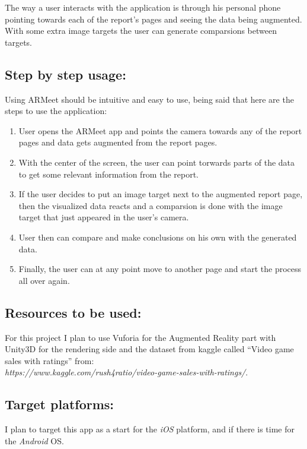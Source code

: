 \documentclass{article}
\begin{document}
The way a user interacts with the application is through his personal
phone pointing towards each of the report's pages and seeing the data being
augmented. With some extra image targets the user can generate comparsions
between targets.

\subsection{Step by step usage:}
Using ARMeet should be intuitive and easy to use, being said that here are
the steps to use the application:
\begin{enumerate}
\item User opens the ARMeet app and points the camera towards any of the
  report pages and data gets augmented from the report pages.
\item With the center of the screen, the user can point torwards parts of the data to
  get some relevant information from the report.
\item If the user decides to put an image target next to the augmented report
  page, then the visualized data reacts and a comparsion is done with the
  image target that just appeared in the user's camera.
\item User then can compare and make conclusions on his own with the
  generated data.
\item Finally, the user can at any point move to another page and start the
  process all over again.
\end{enumerate}

\subsection{Resources to be used:}
For this project I plan to use Vuforia for the Augmented Reality part with
Unity3D for the rendering side and the dataset from kaggle called ``Video
game sales with ratings'' from: \\\textit{https://www.kaggle.com/rush4ratio/video-game-sales-with-ratings/}.
\subsection{Target platforms:}
I plan to target this app as a start for the \textit{iOS} platform, and
if there is time for the \textit{Android} OS.
\end{document}
